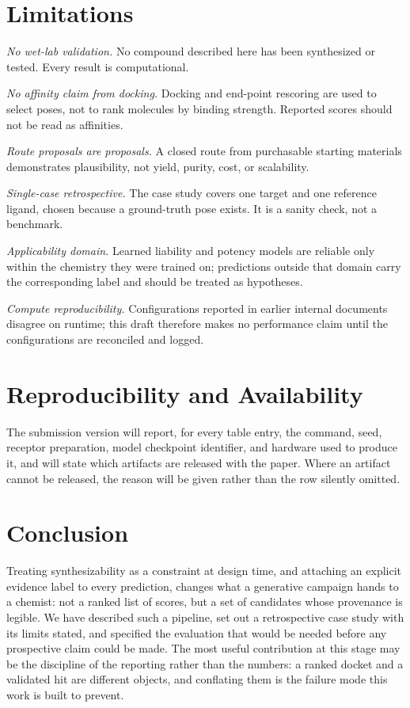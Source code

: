 \documentclass[10pt,twocolumn]{article}
\begin{document}
\section{Limitations}
\label{sec:limits}

\emph{No wet-lab validation.} No compound described here has been synthesized
or tested. Every result is computational.

\emph{No affinity claim from docking.} Docking and end-point rescoring are used
to select poses, not to rank molecules by binding strength. Reported scores
should not be read as affinities.

\emph{Route proposals are proposals.} A closed route from purchasable starting
materials demonstrates plausibility, not yield, purity, cost, or scalability.

\emph{Single-case retrospective.} The case study covers one target and one
reference ligand, chosen because a ground-truth pose exists. It is a sanity
check, not a benchmark.

\emph{Applicability domain.} Learned liability and potency models are reliable
only within the chemistry they were trained on; predictions outside that domain
carry the corresponding label and should be treated as hypotheses.

\emph{Compute reproducibility.} Configurations reported in earlier internal
documents disagree on runtime; this draft therefore makes no performance claim
until the configurations are reconciled and logged.

\section{Reproducibility and Availability}

The submission version will report, for every table entry, the command, seed,
receptor preparation, model checkpoint identifier, and hardware used to produce
it, and will state which artifacts are released with the paper. Where an
artifact cannot be released, the reason will be given rather than the row
silently omitted.

\section{Conclusion}

Treating synthesizability as a constraint at design time, and attaching an
explicit evidence label to every prediction, changes what a generative
campaign hands to a chemist: not a ranked list of scores, but a set of
candidates whose provenance is legible. We have described such a pipeline, set
out a retrospective case study with its limits stated, and specified the
evaluation that would be needed before any prospective claim could be made.
The most useful contribution at this stage may be the discipline of the
reporting rather than the numbers: a ranked docket and a validated hit are
different objects, and conflating them is the failure mode this work is built
to prevent.
\end{document}
